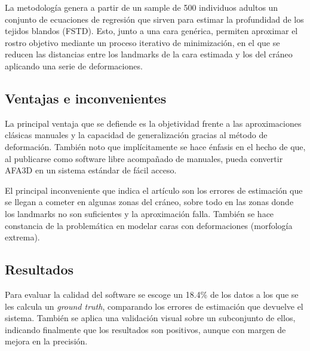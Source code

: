 \documentclass[13pt,a4paper]{article}
\begin{document}
\vspace{\baselineskip}

La metodología genera a partir de un sample de 500 individuos adultos un conjunto de ecuaciones de regresión que sirven para estimar la profundidad de los tejidos blandos (FSTD). Esto, junto a una cara genérica, permiten aproximar el rostro objetivo mediante un proceso iterativo de minimización, en el que se reducen las distancias entre los landmarks de la cara estimada y los del cráneo aplicando una serie de deformaciones.

\subsection{Ventajas e inconvenientes}

La principal ventaja que se defiende es la objetividad frente a las aproximaciones clásicas manuales y la capacidad de generalización gracias al método de deformación. También noto que implícitamente se hace énfasis en el hecho de que, al publicarse como software libre acompañado de manuales, pueda convertir AFA3D en un sistema estándar de fácil acceso.

\vspace{\baselineskip}

El principal inconveniente que indica el artículo son los errores de estimación que se llegan a cometer en algunas zonas del cráneo, sobre todo en las zonas donde los landmarks no son suficientes y la aproximación falla. También se hace constancia de la problemática en modelar caras con deformaciones (morfología extrema).



\subsection{Resultados}

Para evaluar la calidad del software se escoge un 18.4\% de los datos a los que se les calcula un \textit{ground truth}, comparando los errores de estimación que devuelve el sistema.
También se aplica una validación visual sobre un subconjunto de ellos, indicando finalmente que los resultados son positivos, aunque con margen de mejora en la precisión. 
\end{document}

